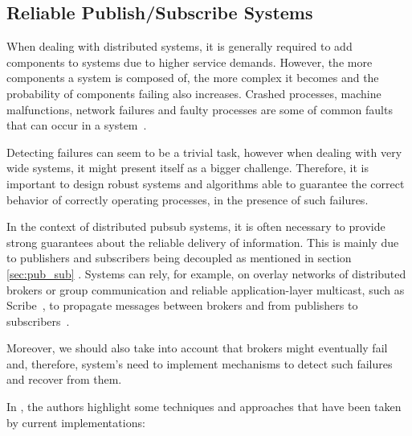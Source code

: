 \subsection{Reliable Publish/Subscribe Systems}
\label{sec:reliable_pub_sub_systems}

When dealing with distributed systems, it is generally required to add components to systems due to higher service demands. However, the more components a system is composed of, the more complex it becomes and the probability of components failing also increases. Crashed processes, machine malfunctions, network failures and faulty processes are some of common faults that can occur in a system~\cite{fault-tolerance-distributed-systems}. 

Detecting failures can seem to be a trivial task, however when dealing with very wide systems, it might present itself as a bigger challenge. Therefore, it is important to design robust systems and algorithms able to guarantee the correct behavior of correctly operating processes, in the presence of such failures. 

In the context of distributed \gls{pubsub} systems, it is often necessary to provide strong guarantees about the reliable delivery of information. This is mainly due to publishers and subscribers being decoupled as mentioned in section \ref{sec:pub_sub} . Systems can rely, for example, on overlay networks of distributed brokers or group communication and reliable application-layer multicast, such as Scribe~\cite{scribe}, to propagate messages between brokers and from publishers to subscribers~\cite{faces-of-pub-sub}.

Moreover, we should also take into account that brokers might eventually fail and, therefore, system's need to implement mechanisms to detect such failures and recover from them.


In \cite{tutorial-on-reliability-in-pubsub}, the authors highlight some techniques and approaches that have been taken by current implementations:

